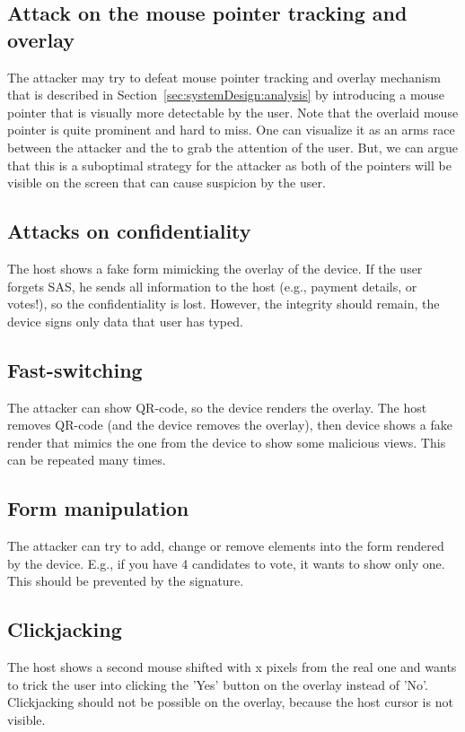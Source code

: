 \subsection{Attack on the mouse pointer tracking and overlay}
\label{sec:securityAnalysis:mousePointer}

The attacker may try to defeat \name mouse pointer tracking and overlay mechanism that is described in Section~\ref{sec:systemDesign:analysis} by introducing a mouse pointer that is visually more detectable by the user. Note that the \device overlaid mouse pointer is quite prominent and hard to miss. One can visualize it as an arms race between the attacker and the \device to grab the attention of the user. But, we can argue that this is a suboptimal strategy for the attacker as both of the pointers will be visible on the screen that can cause suspicion by the user.

\subsection{Attacks on confidentiality}
The host shows a fake form mimicking the overlay of the device. If the user forgets SAS, he sends all information to the host (e.g., payment details, or votes!), so the confidentiality is lost. However, the integrity should remain, the device signs only data that user has typed.

\subsection{Fast-switching}
The attacker can show QR-code, so the device renders the overlay. The host removes QR-code (and the device removes the overlay), then device shows a fake render that mimics the one from the device to show some malicious views. This can be repeated many times.

\subsection{Form manipulation}
The attacker can try to add, change or remove elements into the form rendered by the device. E.g., if you have 4 candidates to vote, it wants to show only one. This should be prevented by the signature.

\subsection{Clickjacking}
The host shows a second mouse shifted with x pixels from the real one and wants to trick the user into clicking the 'Yes' button on the overlay instead of 'No'. Clickjacking should not be possible on the overlay, because the host cursor is not visible.

